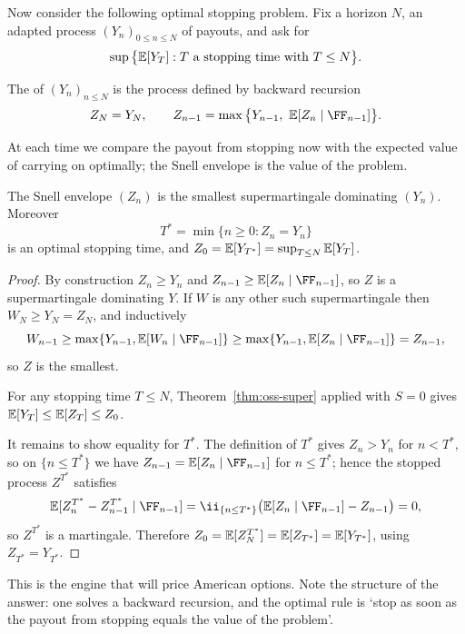 \documentclass[a4paper]{scrartcl}
\begin{document}
Now consider the following optimal stopping problem. Fix a horizon $N$, an adapted process $(Y_n)_{0\leq n \leq N}$ of payouts, and ask for
$$
\sup\big\{\mathbb{E}[Y_T] : T \text{ a stopping time with } T \leq N\big\}.
$$

\begin{definition}
	The  of $(Y_n)_{n \leq N}$ is the process defined by backward recursion
	$$
	Z_N = Y_N, \qquad Z_{n-1} = \max\big\{Y_{n-1},\ \EE[Z_n\mid\FF_{n-1}]\big\}.
	$$
\end{definition}

At each time we compare the payout from stopping now with the expected value of carrying on optimally; the Snell envelope is the value of the problem.

\begin{theorem}\label{thm:snell}
	The Snell envelope $(Z_n)$ is the smallest supermartingale dominating $(Y_n)$. Moreover
	$$
	T^* = \min\{n \geq 0 : Z_n = Y_n\}
	$$
	is an optimal stopping time, and $Z_0 = \mathbb{E}[Y_{T^*}] = \sup_{T\leq N}\mathbb{E}[Y_T]$.
\end{theorem}

\begin{proof}
	By construction $Z_n \geq Y_n$ and $Z_{n-1}\geq\EE[Z_n\mid\FF_{n-1}]$, so $Z$ is a supermartingale dominating $Y$. If $W$ is any other such supermartingale then $W_N \geq Y_N = Z_N$, and inductively
	$$
	W_{n-1}\geq\max\{Y_{n-1}, \EE[W_n\mid\FF_{n-1}]\} \geq \max\{Y_{n-1},\EE[Z_n\mid\FF_{n-1}]\} = Z_{n-1},
	$$
	so $Z$ is the smallest.

	For any stopping time $T \leq N$, Theorem~\ref{thm:oss-super} applied with $S = 0$ gives $\mathbb{E}[Y_T]\leq\mathbb{E}[Z_T]\leq Z_0$.

	It remains to show equality for $T^*$. The definition of $T^*$ gives $Z_n > Y_n$ for $n < T^*$, so on $\{n \leq T^*\}$ we have $Z_{n-1} = \EE[Z_n\mid\FF_{n-1}]$ for $n\leq T^*$; hence the stopped process $Z^{T^*}$ satisfies
	$$
	\EE[Z^{T^*}_n - Z^{T^*}_{n-1}\mid\FF_{n-1}] = \ii_{\{n\leq T^*\}}\big(\EE[Z_n\mid\FF_{n-1}] - Z_{n-1}\big) = 0,
	$$
	so $Z^{T^*}$ is a martingale. Therefore $Z_0 = \mathbb{E}[Z^{T^*}_N] = \mathbb{E}[Z_{T^*}] = \mathbb{E}[Y_{T^*}]$, using $Z_{T^*} = Y_{T^*}$.
\end{proof}

This is the engine that will price American options. Note the structure of the answer: one solves a backward recursion, and the optimal rule is `stop as soon as the payout from stopping equals the value of the problem'.
\end{document}
